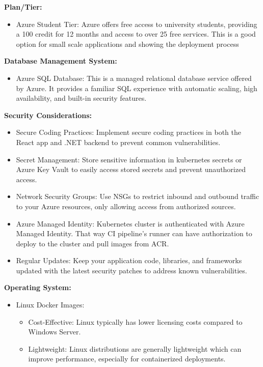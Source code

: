 \documentclass[
    english, %
]{VUMIFPSkursinis}
\begin{document}
\textbf{Plan/Tier:}
\begin{itemize}
    \item Azure Student Tier: Azure offers free access to university students, providing a 100 credit for 12 months and access to over 25 free services. This is a good option for small scale applications and showing the deployment process
\end{itemize}

\textbf{Database Management System:}
\begin{itemize}
    \item Azure SQL Database: This is a managed relational database service offered by Azure. It provides a familiar SQL experience with automatic scaling, high availability, and built-in security features.
\end{itemize}

\textbf{Security Considerations:}
\begin{itemize}
    \item Secure Coding Practices: Implement secure coding practices in both the React app and .NET backend to prevent common vulnerabilities.
    \item Secret Management: Store sensitive information in kubernetes secrets or Azure Key Vault to easily access stored secrets and prevent unauthorized access.
    \item Network Security Groups: Use NSGs to restrict inbound and outbound traffic to your Azure resources, only allowing access from authorized sources.
    \item Azure Managed Identity: Kubernetes cluster is authenticated with Azure Managed Identity. That way CI pipeline's runner can have authorization to deploy to the cluster and pull images from ACR.
    \item Regular Updates: Keep your application code, libraries, and frameworks updated with the latest security patches to address known vulnerabilities.
\end{itemize}

\textbf{Operating System:}
\begin{itemize}
    \item Linux Docker Images:
        \begin{itemize}
            \item Cost-Effective: Linux typically has lower licensing costs compared to Windows Server.
            \item Lightweight: Linux distributions are generally lightweight which can improve performance, especially for containerized deployments.
        \end{itemize}
\end{itemize}
\end{document}
